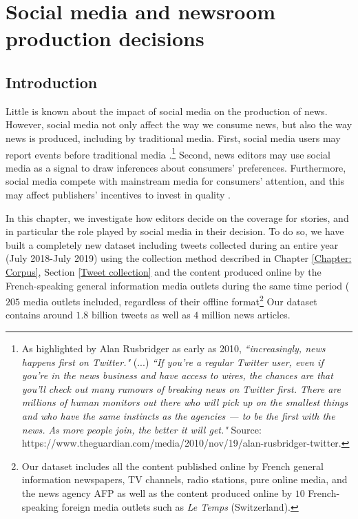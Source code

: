 \chapter{Social media and newsroom production decisions}

\section{Introduction\label{Sec:Introduction}}

Little is known about the impact of social media on the production of news. However, social media not only affect the way we consume news, but also the way news is produced, including by traditional media. First, social media users may report events before traditional media \citep{Sakakietal2010}.\footnote{As highlighted by Alan Rusbridger as early as 2010, \textit{``increasingly, news happens first on Twitter."} (...) \textit{``If you're a regular Twitter user, even if you're in the news business and have access to wires, the chances are that you'll check out many rumours of breaking news on Twitter first. There are millions of human monitors out there who will pick up on the smallest things and who have the same instincts as the agencies — to be the first with the news. As more people join, the better it will get."} Source: https://www.theguardian.com/media/2010/nov/19/alan-rusbridger-twitter.} Second, news editors may use social media as a signal to draw inferences about consumers' preferences. Furthermore, social media compete with mainstream media for consumers' attention, and this may affect publishers' incentives to invest in quality \citep{deCorniereSarvary2019}.

In this chapter, we investigate how editors decide on the coverage for stories, and in particular the role played by social media in their decision. To do so, we have built a completely new dataset including tweets collected during an entire year (July 2018-July 2019) using the collection method described in Chapter \ref{Chapter: Corpus}, Section \ref{Tweet collection} and the content produced online by the French-speaking general information media outlets during the same time period ($205$ media outlets included, regardless of their offline format\footnote{Our dataset includes all the content published online by French general information newspapers, TV channels, radio stations, pure online media, and the news agency AFP as well as the content produced online by $10$ French-speaking foreign media outlets such as \textit{Le Temps} (Switzerland).} Our dataset contains around $1.8$ billion tweets as well as $4$ million news articles.

